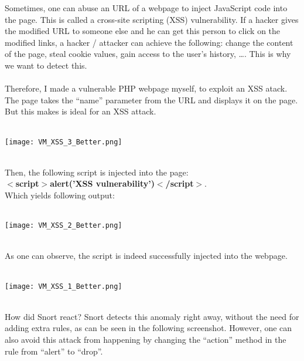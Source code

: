 Sometimes, one can abuse an URL of a webpage to inject JavaScript code into the page. This is called a cross-site scripting (XSS) vulnerability. If a hacker gives the modified URL to someone else and he can get this person to click on the modified links, a hacker / attacker can achieve the following: change the content of the page, steal cookie values, gain access to the user's history, \ldots. This is why we want to detect this. \\ \\
Therefore, I made a vulnerable PHP webpage myself, to exploit an XSS atack. The page takes the ``name'' parameter from the URL and displays it on the page. But this makes is ideal for an XSS attack.
$\;$ \\ \\
\noindent\begin{minipage}{\textwidth}
    \centering
    \texttt{[image: VM\_XSS\_3\_Better.png]}
\end{minipage}
$\;$ \\ \\
Then, the following script is injected into the page: \\
\textbf{$<$script$>$alert('XSS vulnerability')$<$/script$>$}. \\
Which yields following output:
$\;$ \\ \\
\noindent\begin{minipage}{\textwidth}
    \centering
    \texttt{[image: VM\_XSS\_2\_Better.png]}
\end{minipage}
$\;$ \\ \\
As one can observe, the script is indeed successfully injected into the webpage.
$\;$ \\ \\
\noindent\begin{minipage}{\textwidth}
    \centering
    \texttt{[image: VM\_XSS\_1\_Better.png]}
\end{minipage}
$\;$ \\ \\
How did Snort react? Snort detects this anomaly right away, without the need for adding extra rules, as can be seen in the following screenshot. However, one can also avoid this attack from happening by changing the ``action'' method in the rule from ``alert'' to ``drop''.

